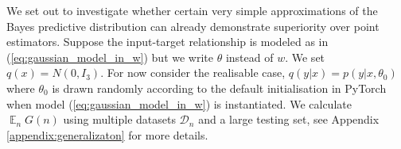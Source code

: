 \documentclass[11pt]{article}
\DeclareMathOperator*{\E}{\operatorname{\mathbb{E}}}
\numberwithin{equation}{section}
\theoremstyle{plain}
\theoremstyle{definition}
\begin{document}
We set out to investigate whether certain very simple approximations of the Bayes predictive distribution can already demonstrate superiority over point estimators. 
Suppose the input-target relationship is modeled as in (\ref{eq:gaussian_model_in_w}) but we write $\theta$ instead of $w$.
We set $q(x) = N(0,I_3)$. 
For now consider the realisable case, $q(y|x) = p(y|x,\theta_0)$ where $\theta_0$ is drawn randomly according to the default initialisation in PyTorch when model (\ref{eq:gaussian_model_in_w}) is instantiated. We calculate $\E_n G(n)$ using multiple datasets $\mathcal D_n$ and a large testing set, see Appendix \ref{appendix:generalizaton} for more details. 
\end{document}
